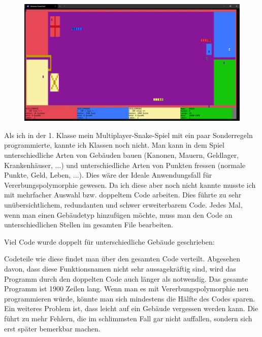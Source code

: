 					\begin{figure}[H]
						\includegraphics[width=\textwidth]{polymorphie/universell/vererbung/beispiele/snake/snake.png}
					\end{figure}
					
					Als ich in der 1. Klasse mein Multiplayer-Snake-Spiel mit ein paar Sonderregeln programmierte, kannte
					ich Klassen noch nicht. Man kann in dem Spiel unterschiedliche Arten von Gebäuden bauen (Kanonen, Mauern, Geldlager,
					Krankenhäuser, ...) und unterschiedliche Arten von Punkten fressen (normale Punkte, Geld, Leben, ...).
					Dies wäre der Ideale Anwendungsfall für Vererbungspolymorphie gewesen. Da ich diese aber noch nicht
					kannte musste ich mit mehrfacher Auswahl bzw. doppeltem Code arbeiten. Dies führte zu sehr unübersichtlichem, redundanten
					und schwer erweiterbarem Code. Jedes Mal, wenn man einen Gebäudetyp hinzufügen möchte, muss man den Code
					an unterschiedlichen Stellen im gesamten File bearbeiten.
					
					Viel Code wurde doppelt für unterschiedliche Gebäude geschrieben:
					
					\UseRawInputEncoding{}
					
					Codeteile wie diese findet man über den gesamten Code verteilt. Abgesehen davon, dass diese
					Funktionsnamen nicht sehr aussagekräftig sind, wird das Programm durch den doppelten Code
					auch länger als notwendig. Das gesamte Programm ist 1900 Zeilen lang. Wenn man es mit
					Vererbungspolymorphie neu programmieren würde, könnte man sich mindestens die Hälfte des Codes sparen.
					Ein weiteres Problem ist, dass leicht auf ein Gebäude vergessen werden kann. Die führt zu mehr Fehlern,
					die im schlimmsten Fall gar nicht auffallen, sondern sich erst später bemerkbar machen.
					
